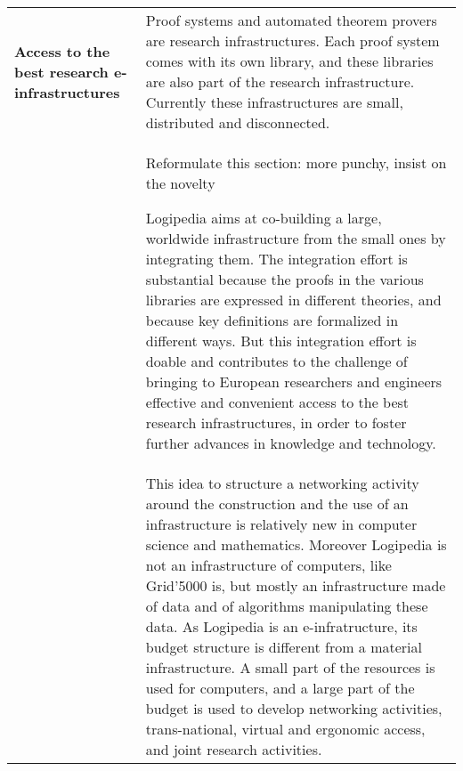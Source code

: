 \begin{longtable}{|p{}|p{}|}
\hline
{\bf Access to the best research e-infrastructures}
&
Proof systems and automated theorem provers are research
infrastructures. Each proof system comes with its own library, and
these libraries are also part of the research infrastructure.  Currently
these infrastructures are small, distributed and disconnected.\\
&
{\color{red} Reformulate this section: more punchy, insist on
the novelty}

\hspace{0.4cm}
Logipedia aims at co-building a large, worldwide infrastructure from the
small ones by integrating them.  The integration effort is substantial
because the proofs in the various libraries are expressed in different
theories, and because key definitions are formalized in different
ways.  But this integration effort is doable and contributes to the
challenge of bringing to European researchers and engineers effective and
convenient access to the best research infrastructures, in order to
foster further advances in knowledge and technology.\\
&
\hspace{0.4cm}
This idea to structure a networking activity around the construction
and the use of an infrastructure is relatively new in computer science
and mathematics. Moreover Logipedia is not an infrastructure of
computers, like Grid'5000 is, but mostly an infrastructure made of
data and of algorithms manipulating these data.  As Logipedia is an
e-infratructure, its budget structure is different from a material
infrastructure. A small part of the resources is used for computers,
and a large part of the budget is used to develop networking
activities, trans-national, virtual and ergonomic access, and joint
research activities.\\
\hline


\end{longtable}
